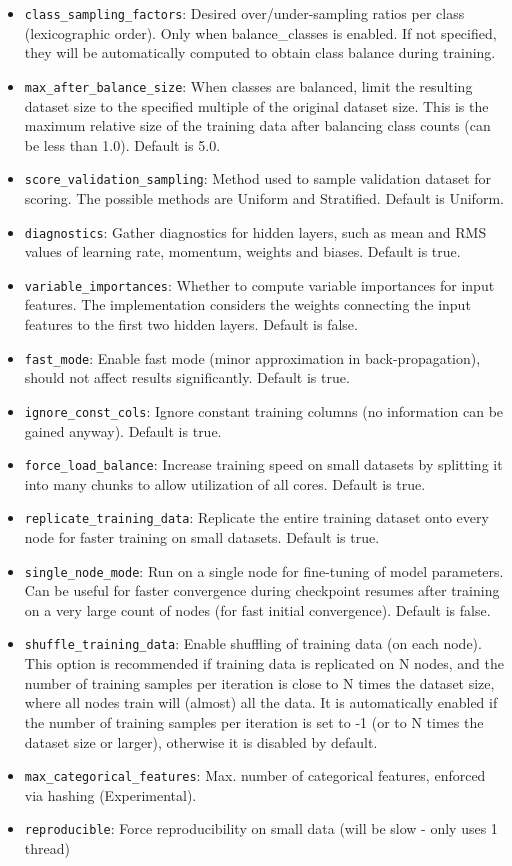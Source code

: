 \documentclass[11pt]{article}
\begin{document}
\begin{itemize}
\item \texttt{class\_sampling\_factors}: Desired over/under-sampling ratios per class (lexicographic order). Only when balance\_classes is enabled. If not specified, they will be automatically computed to obtain class balance during training.
\item \texttt{max\_after\_balance\_size}: When classes are balanced, limit the resulting dataset size to the specified multiple of the original dataset size. This is the maximum relative size of the training data after balancing class counts (can be less than 1.0). Default is 5.0.
\item \texttt{score\_validation\_sampling}: Method used to sample validation dataset for scoring. The possible methods are Uniform and Stratified. Default is Uniform.
\item \texttt{diagnostics}: Gather diagnostics for hidden layers, such as mean and RMS values of learning rate, momentum, weights and biases. Default is true.
\item \texttt{variable\_importances}: Whether to compute variable importances for input features. The implementation considers the weights connecting the input features to the first two hidden layers. Default is false.
\item \texttt{fast\_mode}: Enable fast mode (minor approximation in back-propagation), should not affect results significantly. Default is true.
\item \texttt{ignore\_const\_cols}: Ignore constant training columns (no information can be gained anyway). Default is true.
\item \texttt{force\_load\_balance}:  Increase training speed on small datasets by splitting it into many chunks to allow utilization of all cores. Default is true.
\item \texttt{replicate\_training\_data}:  Replicate the entire training dataset onto every node for faster training on small datasets. Default is true.
\item \texttt{single\_node\_mode}:  Run on a single node for fine-tuning of model parameters. Can be useful for faster convergence during checkpoint resumes after training on a very large count of nodes (for fast initial convergence). Default is false.
\item \texttt{shuffle\_training\_data}: Enable shuffling of training data (on each node). This option is recommended if training data is replicated on N nodes, and the number of training samples per iteration is close to N times the dataset size, where all nodes train will (almost) all the data. It is automatically enabled if the number of training samples per iteration is set to -1 (or to N times the dataset size or larger), otherwise it is disabled by default.
\item \texttt{max\_categorical\_features}:  Max. number of categorical features, enforced via hashing (Experimental).
\item \texttt{reproducible}: Force reproducibility on small data (will be slow - only uses 1 thread)
\end{itemize}
\end{document}
